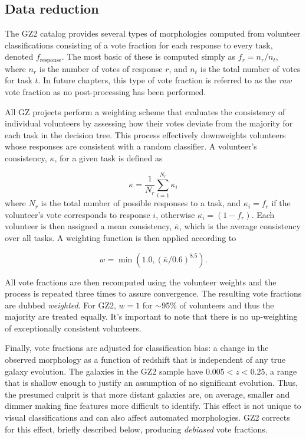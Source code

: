 \subsection{Data reduction}

The GZ2 catalog provides several types of morphologies computed from volunteer classifications consisting of a vote fraction for each response to every task, denoted $f_{\mathrm{response}}$. The most basic of these is computed simply as $f_r = n_r/n_t$, where $n_r$ is the number of votes of response $r$, and $n_t$ is the total number of votes for task $t$. In future chapters, this type of vote fraction is referred to as the \textit{raw} vote fraction as no post-processing has been performed. 

All GZ projects perform a weighting scheme that evaluates the consistency of individual volunteers by assessing how their votes deviate from the majority for each task in the decision tree. This process effectively downweights volunteers whose responses are consistent with a random classifier. A volunteer's consistency, $\kappa$, for a given task is defined as 

\begin{equation}
\kappa = \frac{1}{N_r}\sum_{i=1}^{N_r}{\kappa_i}
\end{equation}
where $N_r$ is the total number of possible responses to a task, and $\kappa_i = f_r$ if the volunteer's vote corresponds to response $i$, otherwise $\kappa_i=(1-f_r)$. Each volunteer is then assigned a mean consistency, $\bar\kappa$, which is the average consistency over all tasks. A weighting function is then applied according to  

\begin{equation}
w = \min({1.0, (\bar\kappa/0.6)^{8.5}}).
\end{equation}

All vote fractions are then recomputed using the volunteer weights and the process is repeated three times to assure convergence. The resulting vote fractions are dubbed \textit{weighted}. For GZ2, $w=1$ for $\sim$95\% of volunteers and thus the majority are treated equally. It's important to note that there is no up-weighting of exceptionally consistent volunteers.


Finally, vote fractions are adjusted for classification bias: a change in the observed morphology as a function of redshift that is independent of any true galaxy evolution. The galaxies in the GZ2 sample have $0.005<z<0.25$, a range that is shallow enough to justify an assumption of no significant evolution.  Thus, the presumed culprit is that more distant galaxies are, on average, smaller and dimmer making fine features more difficult to identify. This effect is not unique to visual classifications and can also affect automated morphologies. GZ2 corrects for this effect, briefly described below, producing \textit{debiased} vote fractions.

